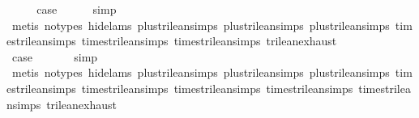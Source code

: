 \begin{isabellebody}
\ \ \isamarkupfalse%
\ \isamarkupfalse%
\ {\isacharquery}case\isanewline
\ \ \ \ \isamarkupfalse%
\ simp\isanewline
\ \ \ \ \isamarkupfalse%
\ {\isacharparenleft}metis\ {\isacharparenleft}no{\isacharunderscore}types{\isacharcomma}\ hide{\isacharunderscore}lams{\isacharparenright}\ plus{\isacharunderscore}trilean{\isachardot}simps{\isacharparenleft}{}{\isacharparenright}\ plus{\isacharunderscore}trilean{\isachardot}simps{\isacharparenleft}{}{\isacharparenright}\ plus{\isacharunderscore}trilean{\isachardot}simps{\isacharparenleft}{}{\isacharparenright}\ times{\isacharunderscore}trilean{\isachardot}simps{\isacharparenleft}{}{\isacharparenright}\ times{\isacharunderscore}trilean{\isachardot}simps{\isacharparenleft}{}{\isacharparenright}\ times{\isacharunderscore}trilean{\isachardot}simps{\isacharparenleft}{}{\isacharparenright}\ trilean{\isachardot}exhaust{\isacharparenright}\isanewline
{}\isamarkupfalse%
\isanewline
\ \ \isamarkupfalse%
\ {\isachardoublequoteopen}{}{\isacharunderscore}{}{\isachardoublequoteclose}\isanewline
\ \ \isamarkupfalse%
\ \isamarkupfalse%
\ {\isacharquery}case\ \isanewline
\ \ \ \ \isamarkupfalse%
\ simp\isanewline
\ \ \ \ \isamarkupfalse%
\ {\isacharparenleft}metis\ {\isacharparenleft}no{\isacharunderscore}types{\isacharcomma}\ hide{\isacharunderscore}lams{\isacharparenright}\ plus{\isacharunderscore}trilean{\isachardot}simps{\isacharparenleft}{}{\isacharparenright}\ plus{\isacharunderscore}trilean{\isachardot}simps{\isacharparenleft}{}{\isacharparenright}\ plus{\isacharunderscore}trilean{\isachardot}simps{\isacharparenleft}{}{\isacharparenright}\ times{\isacharunderscore}trilean{\isachardot}simps{\isacharparenleft}{}{\isacharparenright}\ times{\isacharunderscore}trilean{\isachardot}simps{\isacharparenleft}{}{\isacharparenright}\ times{\isacharunderscore}trilean{\isachardot}simps{\isacharparenleft}{}{\isacharparenright}\ times{\isacharunderscore}trilean{\isachardot}simps{\isacharparenleft}{}{\isacharparenright}\ times{\isacharunderscore}trilean{\isachardot}simps{\isacharparenleft}{}{\isacharparenright}\ trilean{\isachardot}exhaust{\isacharparenright}\isanewline
{}\isamarkupfalse%
\isanewline
\ \ \isamarkupfalse%
\ {\isachardoublequoteopen}{}{\isacharunderscore}{}{\isachardoublequoteclose}\isanewline

\end{isabellebody}
